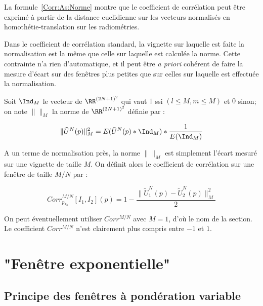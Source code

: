 \label{Vign:Taille:Un}

La formule~\ref{Corr:As:Norme} montre que  le coefficient de corr\'elation
peut \^etre exprim\'e \`a partir de  la distance euclidienne sur les vecteurs
normalis\'es en homoth\'etie-translation sur les radiom\'etries.

Dans le coefficient de corr\'elation standard, la vignette sur
laquelle est faite la normalisation est la m\^eme que celle sur
laquelle est calcul\'ee la norme. Cette contrainte n'a rien
d'automatique, et il peut \^etre \emph{a priori} coh\'erent de
faire la mesure d'\'ecart sur des fen\^etres plus petites que
sur celles sur laquelle est effectu\'ee la normalisation.

Soit $\Ind_M$ le vecteur de  $\RR^{(2N+1)^2}$ qui vaut $1$ ssi $(l\leq M , m \leq M)$
et $0$ sinon; on note $\| \|_M$ la norme de $\RR^{(2N+1)^2}$ d\'efinie
par :

\begin{equation}
 \|\tilde{U}^N(p)\|_M^2 = E(\tilde{U}^N(p)* \Ind_M ) * \frac{1}{E(\Ind_M)}
\end{equation}

A un terme de normalisation pr\`es, la norme $\| \|_M$ est simplement
l'\'ecart mesur\'e sur une vignette de taille $M$. On d\'efinit alors
le coefficient de corr\'elation sur une fen\^etre de taille $M/N$ par :


\begin{equation}
   Corr^{M/N}_{p_{x_0}}[I_1,I_2](p) =  1-
        \frac{ \| \tilde{U}^N_1(p)-\tilde{U}^N_2(p)\|_M^2}{2}
\end{equation}

On peut \'eventuellement utiliser $ Corr^{M/N}$ avec $M=1$,
d'o\`u le nom de la section. Le coefficient  $ Corr^{M/N}$
n'est clairement plus compris entre $-1$ et $1$.




\section{"Fen\^etre exponentielle"}


\subsection{Principe des fen\^etres \`a pond\'eration variable}

